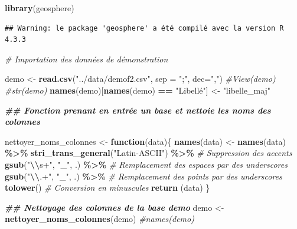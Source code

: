 \documentclass[
]{article}
\newenvironment{Shaded}{\begin{snugshade}}{\end{snugshade}}
\newcommand{\AttributeTok}[1]{\textcolor[rgb]{0.13,0.29,0.53}{#1}}
\newcommand{\CommentTok}[1]{\textcolor[rgb]{0.56,0.35,0.01}{\textit{#1}}}
\newcommand{\ControlFlowTok}[1]{\textcolor[rgb]{0.13,0.29,0.53}{\textbf{#1}}}
\newcommand{\DocumentationTok}[1]{\textcolor[rgb]{0.56,0.35,0.01}{\textbf{\textit{#1}}}}
\newcommand{\FunctionTok}[1]{\textcolor[rgb]{0.13,0.29,0.53}{\textbf{#1}}}
\newcommand{\NormalTok}[1]{#1}
\newcommand{\OtherTok}[1]{\textcolor[rgb]{0.56,0.35,0.01}{#1}}
\newcommand{\SpecialCharTok}[1]{\textcolor[rgb]{0.81,0.36,0.00}{\textbf{#1}}}
\newcommand{\StringTok}[1]{\textcolor[rgb]{0.31,0.60,0.02}{#1}}
\begin{document}
\begin{Shaded}
\begin{Highlighting}[]
\FunctionTok{library}\NormalTok{(geosphere)}
\end{Highlighting}
\end{Shaded}

\begin{verbatim}
## Warning: le package 'geosphere' a été compilé avec la version R 4.3.3
\end{verbatim}

\begin{Shaded}
\begin{Highlighting}[]
\CommentTok{\# Importation des données de démonstration}

\NormalTok{demo }\OtherTok{\textless{}{-}} \FunctionTok{read.csv}\NormalTok{(}\StringTok{"../data/demof2.csv"}\NormalTok{, }\AttributeTok{sep =} \StringTok{";"}\NormalTok{, }\AttributeTok{dec=}\StringTok{","}\NormalTok{)}
\CommentTok{\#View(demo)}
\CommentTok{\#str(demo)}
\FunctionTok{names}\NormalTok{(demo)[}\FunctionTok{names}\NormalTok{(demo) }\SpecialCharTok{==} \StringTok{"Libellé"}\NormalTok{] }\OtherTok{\textless{}{-}} \StringTok{"libelle\_maj"}

\DocumentationTok{\#\# Fonction prenant en entrée un base et nettoie les noms des colonnes}

\NormalTok{nettoyer\_noms\_colonnes }\OtherTok{\textless{}{-}} \ControlFlowTok{function}\NormalTok{(data)\{}
  \FunctionTok{names}\NormalTok{(data) }\OtherTok{\textless{}{-}} \FunctionTok{names}\NormalTok{(data) }\SpecialCharTok{\%\textgreater{}\%}
    \FunctionTok{stri\_trans\_general}\NormalTok{(}\StringTok{"Latin{-}ASCII"}\NormalTok{) }\SpecialCharTok{\%\textgreater{}\%} \CommentTok{\# Suppression des accents}
    \FunctionTok{gsub}\NormalTok{(}\StringTok{"}\SpecialCharTok{\textbackslash{}\textbackslash{}}\StringTok{s+"}\NormalTok{, }\StringTok{"\_"}\NormalTok{, .) }\SpecialCharTok{\%\textgreater{}\%} \CommentTok{\# Remplacement des espaces par des underscores}
    \FunctionTok{gsub}\NormalTok{(}\StringTok{"}\SpecialCharTok{\textbackslash{}\textbackslash{}}\StringTok{.+"}\NormalTok{, }\StringTok{"\_"}\NormalTok{, .) }\SpecialCharTok{\%\textgreater{}\%} \CommentTok{\# Remplacement des points par des underscores}
    \FunctionTok{tolower}\NormalTok{() }\CommentTok{\# Conversion en minuscules}
  \FunctionTok{return}\NormalTok{ (data) }
\NormalTok{\}}

\DocumentationTok{\#\# Nettoyage des colonnes de la base demo}
\NormalTok{demo }\OtherTok{\textless{}{-}} \FunctionTok{nettoyer\_noms\_colonnes}\NormalTok{(demo)}
\CommentTok{\#names(demo)}



\end{Highlighting}
\end{Shaded}
\end{document}

